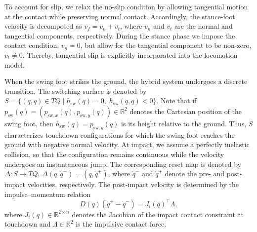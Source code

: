 \documentclass[letterpaper, 10 pt, conference]{ieeeconf}
\newcommand{\ara}[1]{\textcolor{purple}{(ARA: #1)}}
\begin{document}
To account for slip, we relax the no-slip condition by allowing tangential motion at the contact while preserving normal contact.
Accordingly, the stance-foot velocity is decomposed as
$v_f = v_n + v_t$, where $v_n$ and $v_t$ are the normal and tangential components, respectively.
During the stance phase we impose the contact condition, $v_n = 0$, but allow for the tangential component to be non-zero, $v_t \neq 0$.
Thereby, tangential slip is explicitly incorporated into the locomotion model. 


When the swing foot strikes the ground, the hybrid system undergoes a discrete transition.
The switching surface is denoted by $S = \{(q,\dot q)\in TQ \mid h_{\mathrm{sw}}(q)=0,\;\dot h_{\mathrm{sw}}(q,\dot q)<0\}$. Note that if $p_{\mathrm{sw}}(q)=(p_{\mathrm{sw},x}(q),p_{\mathrm{sw},y}(q))\in\mathbb R^2$ denotes the Cartesian position of the swing foot, then $h_{\mathrm{sw}}(q)=p_{\mathrm{sw},y}(q)$ is its height relative to the ground. Thus, $S$ characterizes touchdown configurations for which the swing foot reaches the ground with negative normal velocity. At impact, we assume a perfectly inelastic collision, so that the configuration remains continuous while the velocity undergoes an instantaneous jump. The corresponding reset map is denoted by $\Delta:S\to TQ,\,\Delta(q,\dot q^-)=(q,\dot q^+)$, where $\dot q^-$ and $\dot q^+$ denote the pre- and post-impact velocities, respectively.
The post-impact velocity is determined by the impulse--momentum relation
\begin{equation}
D(q)(\dot q^+ - \dot q^-) = J_i(q)^\top \Lambda,
\end{equation}
where $J_i(q)\in\mathbb R^{2\times n}$ denotes the Jacobian of the impact contact constraint at touchdown and $\Lambda\in\mathbb R^2$ is the impulsive contact force.
\end{document}
